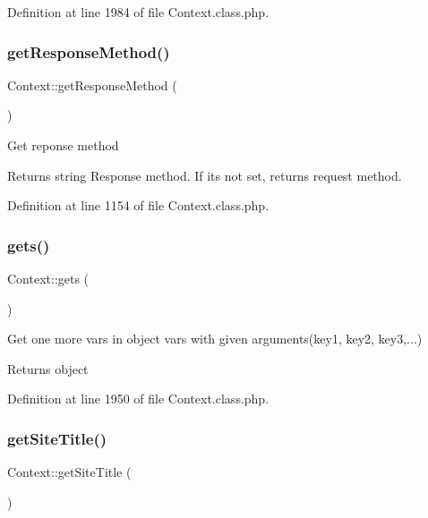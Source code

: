Definition at line 1984 of file Context.\+class.\+php.

\mbox{\label{classContext_a1d02a15209360034cd719d8b08cb5061}} 
\subsubsection{\texorpdfstring{get\+Response\+Method()}{getResponseMethod()}}
{\footnotesize\ttfamily Context\+::get\+Response\+Method (\begin{DoxyParamCaption}{ }\end{DoxyParamCaption})}

Get reponse method

\begin{DoxyReturn}{Returns}
string Response method. If it\textquotesingle{}s not set, returns request method. 
\end{DoxyReturn}


Definition at line 1154 of file Context.\+class.\+php.

\mbox{\label{classContext_ae906c0b1533a8e4ce7836d3665b46288}} 
\subsubsection{\texorpdfstring{gets()}{gets()}}
{\footnotesize\ttfamily Context\+::gets (\begin{DoxyParamCaption}{ }\end{DoxyParamCaption})}

Get one more vars in object vars with given arguments(key1, key2, key3,...)

\begin{DoxyReturn}{Returns}
object 
\end{DoxyReturn}


Definition at line 1950 of file Context.\+class.\+php.

\mbox{\label{classContext_a0ee79330d3ee12c811cd784e24a7b017}} 
\subsubsection{\texorpdfstring{get\+Site\+Title()}{getSiteTitle()}}
{\footnotesize\ttfamily Context\+::get\+Site\+Title (\begin{DoxyParamCaption}{ }\end{DoxyParamCaption})}

